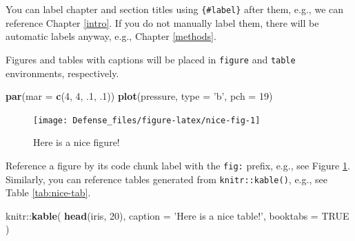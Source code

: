 \documentclass[11pt,]{book}
\newenvironment{Shaded}{\begin{snugshade}}{\end{snugshade}}
\newcommand{\KeywordTok}[1]{\textcolor[rgb]{0.13,0.29,0.53}{\textbf{{#1}}}}
\newcommand{\DataTypeTok}[1]{\textcolor[rgb]{0.13,0.29,0.53}{{#1}}}
\newcommand{\DecValTok}[1]{\textcolor[rgb]{0.00,0.00,0.81}{{#1}}}
\newcommand{\StringTok}[1]{\textcolor[rgb]{0.31,0.60,0.02}{{#1}}}
\newcommand{\OtherTok}[1]{\textcolor[rgb]{0.56,0.35,0.01}{{#1}}}
\newcommand{\NormalTok}[1]{{#1}}
\theoremstyle{definition}
\theoremstyle{definition}
\theoremstyle{remark}
\begin{document}
You can label chapter and section titles using \texttt{\{\#label\}}
after them, e.g., we can reference Chapter \ref{intro}. If you do not
manually label them, there will be automatic labels anyway, e.g.,
Chapter \ref{methods}.

Figures and tables with captions will be placed in \texttt{figure} and
\texttt{table} environments, respectively.

\begin{Shaded}
\begin{Highlighting}[]
\KeywordTok{par}\NormalTok{(}\DataTypeTok{mar =} \KeywordTok{c}\NormalTok{(}\DecValTok{4}\NormalTok{, }\DecValTok{4}\NormalTok{, .}\DecValTok{1}\NormalTok{, .}\DecValTok{1}\NormalTok{))}
\KeywordTok{plot}\NormalTok{(pressure, }\DataTypeTok{type =} \StringTok{'b'}\NormalTok{, }\DataTypeTok{pch =} \DecValTok{19}\NormalTok{)}
\end{Highlighting}
\end{Shaded}

\begin{figure}

{\centering \texttt{[image: Defense\_files/figure-latex/nice-fig-1]} 

}

\caption{Here is a nice figure!}\label{fig:nice-fig}
\end{figure}

Reference a figure by its code chunk label with the \texttt{fig:}
prefix, e.g., see Figure \ref{fig:nice-fig}. Similarly, you can
reference tables generated from \texttt{knitr::kable()}, e.g., see Table
\ref{tab:nice-tab}.

\begin{Shaded}
\begin{Highlighting}[]
\NormalTok{knitr::}\KeywordTok{kable}\NormalTok{(}
  \KeywordTok{head}\NormalTok{(iris, }\DecValTok{20}\NormalTok{), }\DataTypeTok{caption =} \StringTok{'Here is a nice table!'}\NormalTok{,}
  \DataTypeTok{booktabs =} \OtherTok{TRUE}
\NormalTok{)}
\end{Highlighting}
\end{Shaded}
\end{document}
